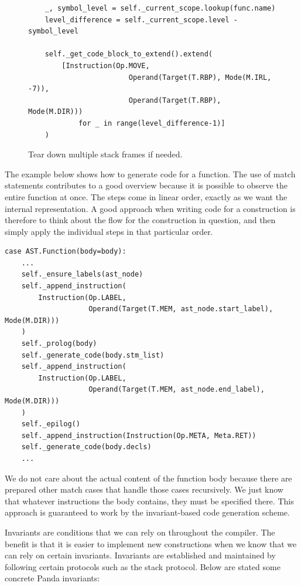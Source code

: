 \begin{figure}[H]
    \centering
\begin{verbatim}
    _, symbol_level = self._current_scope.lookup(func.name)
    level_difference = self._current_scope.level - symbol_level
    
    self._get_code_block_to_extend().extend(
        [Instruction(Op.MOVE,
                        Operand(Target(T.RBP), Mode(M.IRL, -7)),
                        Operand(Target(T.RBP), Mode(M.DIR)))
            for _ in range(level_difference-1)]
    )
    \end{verbatim}
    \caption{Tear down multiple stack frames if needed.}
    \label{fig:remove_stack_frames}
\end{figure}

The example below shows how to generate code for a function. The use of match statements contributes to a good overview because it is possible to observe the entire function at once. The steps come in linear order, exactly as we want the internal representation. A good approach when writing code for a construction is therefore to think about the flow for the construction in question, and then simply apply the individual steps in that particular order.

\begin{verbatim}
case AST.Function(body=body):
    ...
    self._ensure_labels(ast_node)
    self._append_instruction(
        Instruction(Op.LABEL,
                    Operand(Target(T.MEM, ast_node.start_label), Mode(M.DIR)))
    )
    self._prolog(body)
    self._generate_code(body.stm_list)
    self._append_instruction(
        Instruction(Op.LABEL,
                    Operand(Target(T.MEM, ast_node.end_label), Mode(M.DIR)))
    )
    self._epilog()
    self._append_instruction(Instruction(Op.META, Meta.RET))
    self._generate_code(body.decls)
    ...
\end{verbatim}

We do not care about the actual content of the function body because there are prepared other match cases that handle those cases recursively. We just know that whatever instructions the body contains, they must be specified there. This approach is guaranteed to work by the invariant-based code generation scheme.

Invariants are conditions that we can rely on throughout the compiler. The benefit is that it is easier to implement new constructions when we know that we can rely on certain invariants. Invariants are established and maintained by following certain protocols such as the stack protocol. Below are stated some concrete Panda invariants:

